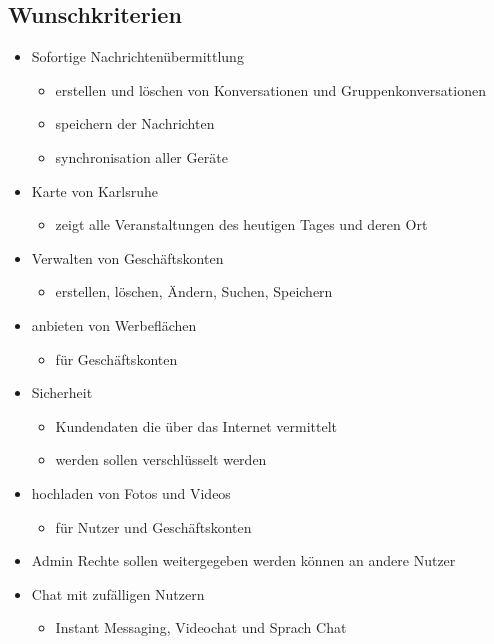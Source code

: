 \documentclass[parskip=full]{scrartcl}
\begin{document}
	\subsection{Wunschkriterien}
		\begin{itemize}[nosep]
			\item Sofortige Nachrichtenübermittlung
			\begin{itemize}
				\item erstellen und löschen von Konversationen und Gruppenkonversationen
				\item speichern der Nachrichten
				\item synchronisation aller Geräte
			\end{itemize}
			
			\item Karte von Karlsruhe
				\begin{itemize}
					\item zeigt alle Veranstaltungen des heutigen Tages und deren Ort
				\end{itemize}
			\item Verwalten von Geschäftskonten
				\begin{itemize}
					\item erstellen, löschen, Ändern, Suchen, Speichern
				\end{itemize}
			\item anbieten von Werbeflächen
				\begin{itemize}
					\item für Geschäftskonten
				\end{itemize}
			\item Sicherheit
				\begin{itemize}
					\item Kundendaten die über das Internet vermittelt \item werden sollen verschlüsselt werden
				\end{itemize}
			\item hochladen von Fotos und Videos
				\begin{itemize}
					\item für Nutzer und Geschäftskonten
				\end{itemize}
			\item Admin Rechte sollen weitergegeben werden können an andere Nutzer
			\item Chat mit zufälligen Nutzern
				\begin{itemize}
					\item Instant Messaging, Videochat und Sprach Chat

\end{itemize}
\end{itemize}
\end{document}
